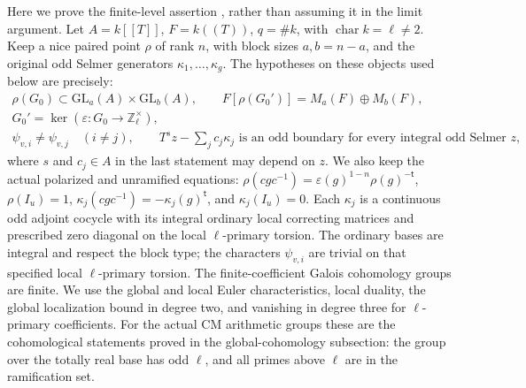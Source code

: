 Here we prove the finite-level assertion , rather
than assuming it in the limit argument.
Let \(A=k[[T]]\), \(F=k((T))\), \(q=\#k\), with
\(\operatorname{char}k=\ell\ne2\).
Keep a nice paired point \(\rho\) of rank \(n\), with block sizes
\(a,b=n-a\), and the original odd Selmer generators
\(\kappa_1,\ldots,\kappa_g\).
The hypotheses on these objects used below are precisely:
\[
 \begin{gathered}
 \rho(G_0)\subset
   \mathrm{GL}_a(A)\times\mathrm{GL}_b(A),\qquad
 F[\rho(G_0')]=M_a(F)\oplus M_b(F),\\
 G_0'=\ker(\varepsilon:G_0\to\mathbb Z_\ell^\times),\\
 \psi_{v,i}\ne\psi_{v,j}\quad(i\ne j),\qquad
 T^s z-\sum_jc_j\kappa_j\text{ is an odd boundary}
 \text{ for every integral odd Selmer }z,
 \tag{B2a}
 \end{gathered}
\]
where \(s\) and \(c_j\in A\) in the last statement may depend on \(z\).
We also keep the actual polarized and unramified equations:
\(\rho(cgc^{-1})=\varepsilon(g)^{1-n}\rho(g)^{-\mathsf t}\),
\(\rho(I_u)=1\),
\(\kappa_j(cgc^{-1})=-\kappa_j(g)^{\mathsf t}\), and
\(\kappa_j(I_u)=0\).
Each \(\kappa_j\) is a continuous odd adjoint cocycle with its
integral ordinary local correcting matrices and prescribed
zero diagonal on the local \(\ell\)-primary torsion.
The ordinary bases are integral and respect the block type;
the characters \(\psi_{v,i}\) are trivial on that specified
local \(\ell\)-primary torsion.
The finite-coefficient Galois cohomology groups are finite.
We use the global and local Euler characteristics, local duality,
the global localization bound in degree two, and vanishing in degree
three for \(\ell\)-primary coefficients.  For the actual CM
arithmetic groups these are the cohomological statements proved
in the global-cohomology subsection: the group over the totally
real base has odd \(\ell\), and all primes above \(\ell\) are in the
ramification set.

